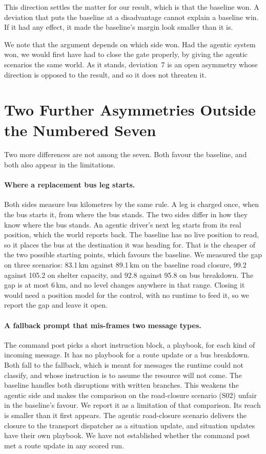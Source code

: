 This direction settles the matter for our result, which is that the baseline
won. A deviation that puts the baseline at a disadvantage cannot explain a
baseline win. If it had any effect, it made the baseline's margin look smaller
than it is.

We note that the argument depends on which side won. Had the agentic system
won, we would first have had to close the gate properly, by giving the agentic
scenarios the same world. As it stands, deviation~7 is an open asymmetry whose
direction is opposed to the result, and so it does not threaten it.

\section{Two Further Asymmetries Outside the Numbered Seven}
\label{sec:val:extra}

Two more differences are not among the seven. Both favour the baseline, and
both also appear in the limitations.

\paragraph{Where a replacement bus leg starts.} Both sides measure bus
kilometres by the same rule. A leg is charged once, when the bus starts it,
from where the bus stands. The two sides differ in how they know where the bus
stands. An agentic driver's next leg starts from its real position, which the
world reports back. The baseline has no live position to read, so it places the
bus at the destination it was heading for. That is the cheaper of the two
possible starting points, which favours the baseline. We measured the gap on
three scenarios: 83.1\,km against 89.1\,km on the baseline road closure, 99.2
against 105.2 on shelter capacity, and 92.8 against 95.8 on bus breakdown. The
gap is at most 6\,km, and no level changes anywhere in that range. Closing it
would need a position model for the control, with no runtime to feed it, so we
report the gap and leave it open.

\paragraph{A fallback prompt that mis-frames two message types.} The command
post picks a short instruction block, a playbook, for each kind of incoming
message. It has no playbook for a route update or a bus breakdown. Both fall to
the fallback, which is meant for messages the runtime could not classify, and
whose instruction is to assume the resource will not come. The baseline handles
both disruptions with written branches. This weakens the agentic side and makes
the comparison on the road-closure scenario (S02) unfair in the baseline's
favour. We report it as a limitation of that comparison. Its reach is smaller
than it first appears. The agentic road-closure scenario delivers the closure
to the transport dispatcher as a situation update, and situation updates have
their own playbook. We have not established whether the command post met a
route update in any scored run.

